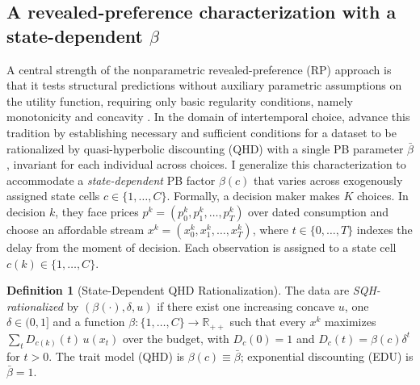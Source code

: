 \documentclass[11pt,a4paper]{article}
\theoremstyle{plain}
\theoremstyle{definition}
\newtheorem{definition}{Definition}
\newcommand{\R}{\mathbb{R}}
\begin{document}
\iffalse
\subsection{A revealed-preference characterization with a state-dependent $\beta$}
\label{subsec:RPtheory}

A central strength of the nonparametric revealed-preference (RP) approach is that it tests structural predictions without auxiliary parametric assumptions on the utility function, requiring only basic regularity conditions, namely monotonicity and concavity \citep{afriat1967, varian1982, browning1989}. In the domain of intertemporal choice, \citet{eis2020} advance this tradition by establishing necessary and sufficient conditions for a dataset to be rationalized by quasi-hyperbolic discounting (QHD) with a single PB parameter $\bar{\beta}$, invariant for each individual across choices. I generalize this characterization to accommodate a \textit{state-dependent} PB factor $\beta(c)$ that varies across exogenously assigned state cells $c \in \{1,\dots,C\}$. %
Formally, a decision maker makes $K$ choices. In decision $k$, they face prices $p^k = (p_0^k, p_1^k, \dots, p_T^k)$ over dated consumption and choose an affordable stream $x^k = (x_0^k, x_1^k, \dots, x_T^k)$, where $t \in \{0, \dots, T\}$ indexes the delay from the moment of decision. Each observation is assigned to a state cell $c(k)\in\{1,\dots,C\}$.


\begin{definition}[State-Dependent QHD Rationalization]
The data are \emph{SQH-rationalized} by $(\beta(\cdot),\delta,u)$ if there exist one
increasing concave $u$, one $\delta\in(0,1]$ and a function $\beta:\{1,\dots,C\}\to\R_{++}$
such that every $x^{k}$ maximizes $\sum_t D_{c(k)}(t)\,u(x_t)$ over the budget, with
$D_c(0)=1$ and $D_c(t)=\beta(c)\delta^{t}$ for $t>0$. The trait model (QHD) is
$\beta(c)\equiv\bar\beta$; exponential discounting (EDU) is $\bar\beta=1$.
\end{definition}
\end{document}
